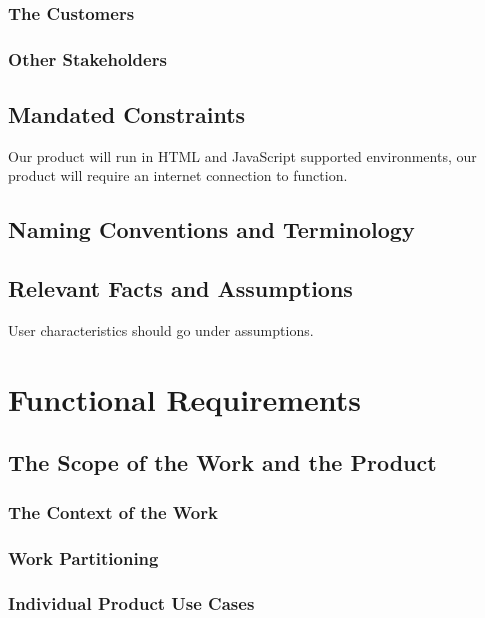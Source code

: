 \documentclass[12pt, titlepage]{article}
\begin{document}
\subsubsection{The Customers}

\subsubsection{Other Stakeholders}

\subsection{Mandated Constraints}

Our product will run in HTML and JavaScript supported environments, our product will require an internet connection to function.

\subsection{Naming Conventions and Terminology}



\subsection{Relevant Facts and Assumptions}

User characteristics should go under assumptions.

\section{Functional Requirements}

\subsection{The Scope of the Work and the Product}

\subsubsection{The Context of the Work}

\subsubsection{Work Partitioning}

\subsubsection{Individual Product Use Cases}
\end{document}
